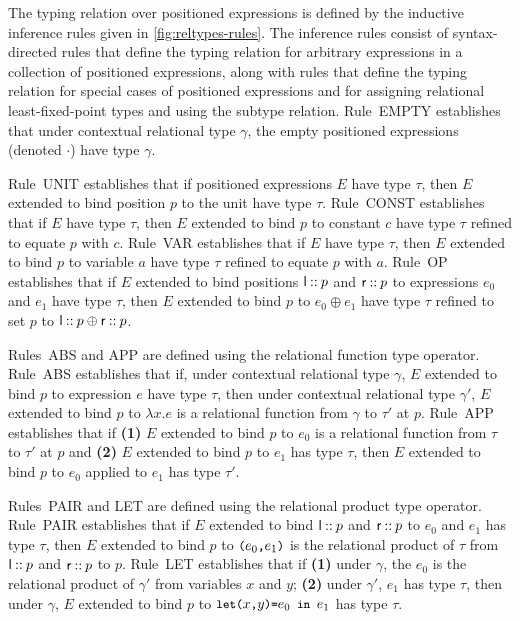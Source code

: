 The typing relation over positioned expressions is defined by the
inductive inference rules given in \autoref{fig:reltypes-rules}.
%
The inference rules consist of syntax-directed rules that define the
typing relation for arbitrary expressions in a collection of
positioned expressions, along with rules that define the typing
relation for special cases of positioned expressions and for assigning
relational least-fixed-point types and using the subtype relation.
Rule~EMPTY establishes that under contextual relational type $\gamma$,
the empty positioned expressions (denoted $\cdot$) have type $\gamma$.

Rule~UNIT establishes that if positioned expressions $E$ have type
$\tau$, then $E$ extended to bind position $p$ to the unit have type
$\tau$.
Rule~CONST establishes that if $E$ have type $\tau$, then $E$ extended
to bind $p$ to constant $c$ have type $\tau$ refined to equate $p$
with $c$.
Rule~VAR establishes that if $E$ have type $\tau$, then $E$ extended
to bind $p$ to variable $a$ have type $\tau$ refined to equate $p$
with $a$.
Rule~OP establishes that if $E$ extended to bind positions
$\mathsf{l} \mathbin{::} p$ and $\mathsf{r} \mathbin{::} p$ to expressions $e_0$
and $e_1$ have type $\tau$, then $E$ extended to bind $p$ to
$e_0 \oplus e_1$ have type $\tau$ refined to set $p$ to
$\mathsf{l} \mathbin{::} p \oplus \mathsf{r} \mathbin{::} p$.

Rules~ABS and APP are defined using the relational function type
operator.
%
Rule~ABS establishes that if, under contextual relational type
$\gamma$, $E$ extended to bind $p$ to expression $e$ have type $\tau$,
then under contextual relational type $\gamma'$, $E$ extended to bind
$p$ to $\lambda x. e$ is a relational function from $\gamma$ to
$\tau'$ at $p$.
Rule~APP establishes that if %
\textbf{(1)} $E$ extended to bind $p$ to $e_0$ is a relational
function from $\tau$ to $\tau'$ at $p$ and %
\textbf{(2)} $E$ extended to bind $p$ to $e_1$ has type $\tau$, then
$E$ extended to bind $p$ to $e_0$ applied to $e_1$ has type $\tau'$.

Rules~PAIR and LET are defined using the relational product type
operator.
Rule~PAIR establishes that if $E$ extended to bind
$\mathsf{l} \mathbin{::} p$ and $\mathsf{r} \mathbin{::} p$ to $e_0$ and $e_1$ has
type $\tau$, then $E$ extended to bind $p$ to $\pair{ e_0 }{ e_1 }$ is
the relational product of $\tau$ from $\mathsf{l} \mathbin{::} p$ and
$\mathsf{r} \mathbin{::} p$ to $p$.
Rule~LET establishes that if %
\textbf{(1)} under $\gamma$, the $e_0$ is the relational product of
$\gamma'$ from variables $x$ and $y$;
%
\textbf{(2)} under $\gamma'$, $e_1$ has type $\tau$, then under
$\gamma$, $E$ extended to bind $p$ to $\letexp{x}{y}{e_0}{e_1}$ has
type $\tau$.

